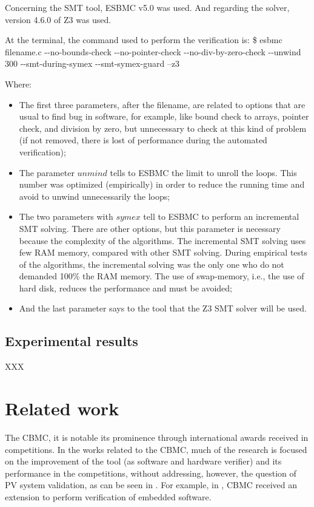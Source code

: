 \documentclass[journal]{IEEEtran}
\begin{document}
Concerning the SMT tool, ESBMC v5.0 was used. And regarding the solver, version 4.6.0 of Z3 was used.

At the terminal, the command used to perform the verification is:
\$ esbmc filename.c -\phantom{}-no-bounds-check -\phantom{}-no-pointer-check -\phantom{}-no-div-by-zero-check -\phantom{}-unwind 300 -\phantom{}-smt-during-symex -\phantom{}-smt-symex-guard --z3

Where:

\begin{itemize}
\item The first three parameters, after the filename, are related to options that are usual to find bug in software, for example, like bound check to arrays, pointer check, and division by zero, but unnecessary to check at this kind of problem (if not removed, there is lost of performance during the automated verification);
\item The parameter $unmind$ tells to ESBMC the limit to unroll the loops. This number was optimized (empirically) in order to reduce the running time and avoid to unwind unnecessarily the loops;
\item The two parameters with $symex$ tell to ESBMC to perform an incremental SMT solving. There are other options, but this parameter is necessary because the complexity of the algorithms. The incremental SMT solving uses few RAM memory, compared with other SMT solving. During empirical tests of the algorithms, the incremental solving was the only one who do not demanded 100\% the RAM memory. The use of swap-memory, i.e., the use of hard disk, reduces the performance and must be avoided;
\item And the last parameter says to the tool that the Z3 SMT solver will be used.
\end{itemize}

\subsection{Experimental results}
\label{sec:results}
XXX

\section{Related work }
The CBMC, it is notable its prominence through international awards received in competitions. In the works related to the CBMC, much of the research is focused on the improvement of the tool (as software and hardware verifier) and its performance in the competitions, without addressing, however, the question of PV system validation, as can be seen in \cite{Kroening}. For example, in \cite{Schrammel2017}, CBMC received an extension to perform verification of embedded software. 
\end{document}
